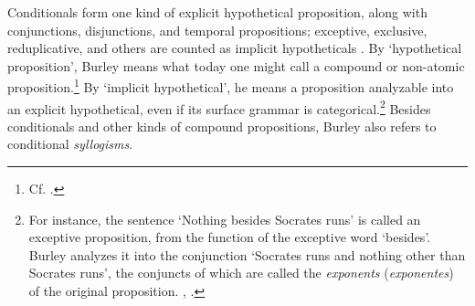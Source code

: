 	Conditionals form one kind of explicit hypothetical proposition, along with conjunctions, disjunctions, and temporal propositions; exceptive, exclusive, reduplicative, and others are counted as implicit hypotheticals \autocite[pp. 106-107]{BurleyDPAL}. By `hypothetical proposition', Burley means what today one might call a compound or non-atomic proposition.\footnote{Cf. \cite[p. 66]{Buridan2015}.} By `implicit hypothetical', he means a proposition analyzable into an explicit hypothetical, even if its surface grammar is categorical.\footnote{For instance, the sentence `Nothing besides Socrates runs' is called an exceptive proposition, from the function of the exceptive word `besides'. Burley analyzes it into the conjunction `Socrates runs and nothing other than Socrates runs', the conjuncts of which are called the \textit{exponents} (\textit{exponentes}) of the original proposition. \autocite[p. 121, par. 44]{Green-Pedersen1980b}, \autocite[pp. 164-165]{BurleyDPAL}.} Besides conditionals and other kinds of compound propositions, Burley also refers to conditional \textit{syllogisms}. %
	
